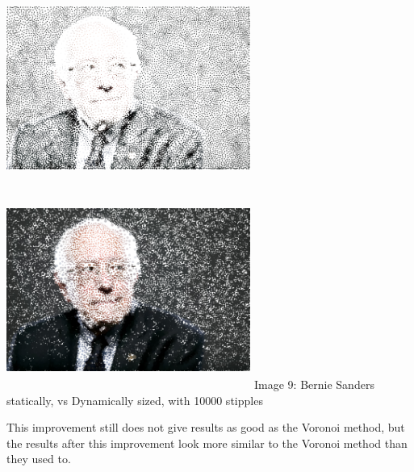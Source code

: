 \documentclass[11pt]{article}
\begin{document}
\includegraphics[width=8cm, height=6.5cm]{sanders-old-10000.png} 
\includegraphics[width=8cm, height=6.5cm]{sanders-new-10000.png}
\newline Image 9: Bernie Sanders statically, vs Dynamically sized, with 10000 stipples 

This improvement still does not give results as good as the Voronoi method, but the results after this improvement look more similar to the Voronoi method than they used to. 





\end{document}
